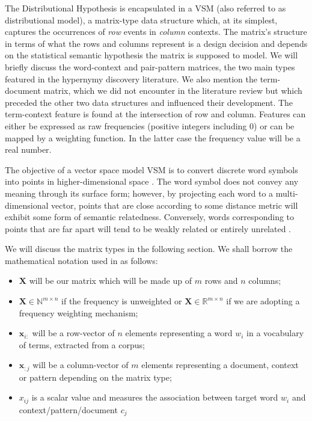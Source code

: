 The Distributional Hypothesis is encapsulated in a \ac{VSM} (also referred to as distributional model), a matrix-type data structure which, at its simplest, captures the occurrences of \textit{row} events in \textit{column} contexts. The matrix’s structure in terms of what the rows and columns represent is a design decision and depends on the statistical semantic hypothesis the matrix is supposed to model.  We will briefly discuss the word-context and pair-pattern matrices, the two main types featured in the hypernymy discovery literature.  We also mention the term-document matrix, which we did not encounter in the literature review but which preceded the other two data structures and influenced their development.  The term-context feature is found at the intersection of row and column.  Features can either be expressed as raw frequencies (positive integers including 0) or can be mapped by a weighting function.  In the latter case the frequency value will be a real number.

The objective of a vector space model \ac{VSM} is to convert discrete word symbols into points in higher-dimensional space \citep{turney2010frequency}.  The word symbol does not convey any meaning through its surface form; however, by projecting each word to a multi-dimensional vector, points that are close according to some distance metric will exhibit some form of semantic relatedness.  Conversely, words corresponding to points that are far apart will tend to be weakly related or entirely unrelated \citep{turney2010frequency}.

We will discuss the matrix types in the following section.  We shall borrow the mathematical notation used in \citep{turney2010frequency} as follows:
\begin{itemize}
    \item $\textbf{X}$ will be our matrix which will be made up of $m$ rows and $n$ columns;
    \item $\textbf{X} \in \mathbb{N}^{m \times n}$ if the frequency is unweighted or $\textbf{X} \in \mathbb{R}^{m \times n}$ if we are adopting a frequency weighting mechanism;
    \item $\textbf{x}_{i:}$ will be a row-vector of $n$ elements representing a word $w_i$ in a vocabulary of terms, extracted from a corpus;
    \item $\textbf{x}_{:j}$ will be a column-vector of $m$ elements representing a document, context or pattern depending on the matrix type;
    \item $x_{ij}$ is a scalar value and measures the association between target word $w_i$ and context/pattern/document $c_j$
\end{itemize}    

